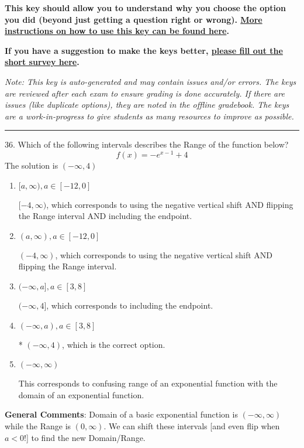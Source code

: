 \documentclass{extbook}[14pt]
\begin{document}
\textbf{This key should allow you to understand why you choose the option you did (beyond just getting a question right or wrong). \href{https://xronos.clas.ufl.edu/mac1105spring2020/courseDescriptionAndMisc/Exams/LearningFromResults}{More instructions on how to use this key can be found here}.}

\textbf{If you have a suggestion to make the keys better, \href{https://forms.gle/CZkbZmPbC9XALEE88}{please fill out the short survey here}.}

\textit{Note: This key is auto-generated and may contain issues and/or errors. The keys are reviewed after each exam to ensure grading is done accurately. If there are issues (like duplicate options), they are noted in the offline gradebook. The keys are a work-in-progress to give students as many resources to improve as possible.}

\rule{\textwidth}{0.4pt}

36. Which of the following intervals describes the Range of the function below?
\[ f(x) = -e^{x-1}+4 \] 
The solution is $ (-\infty, 4) $ 

\begin{enumerate}[label=\Alph*.] 
\item $ [a, \infty), a \in [-12, 0] $ 

 $[-4, \infty)$, which corresponds to using the negative vertical shift AND flipping the Range interval AND including the endpoint. 
\item $ (a, \infty), a \in [-12, 0] $ 

 $(-4, \infty)$, which corresponds to using the negative vertical shift AND flipping the Range interval. 
\item $ (-\infty, a], a \in [3, 8] $ 

 $(-\infty, 4]$, which corresponds to including the endpoint. 
\item $ (-\infty, a), a \in [3, 8] $ 

 * $(-\infty, 4)$, which is the correct option. 
\item $ (-\infty, \infty) $ 

 This corresponds to confusing range of an exponential function with the domain of an exponential function. 
\end{enumerate} 
 
\textbf{General Comments}: Domain of a basic exponential function is $(-\infty, \infty)$ while the Range is $(0, \infty)$. We can shift these intervals [and even flip when $a<0$!] to find the new Domain/Range.
\end{document}

